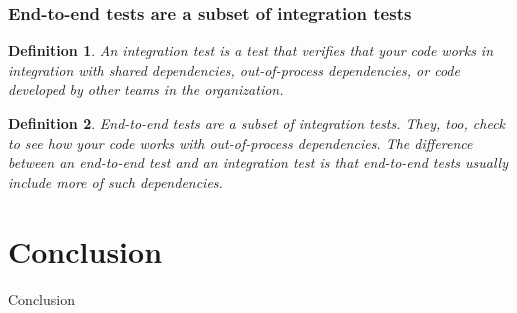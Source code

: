 \documentclass{article}
\newtheorem{definition}{Definition}
\begin{document}
\subsubsection{ End-to-end tests are a subset of integration tests}

\begin{definition}
An integration test is a test that verifies that your code works in integration with shared dependencies, out-of-process dependencies, or code developed by other teams in the organization.
\end{definition}

\begin{definition}
End-to-end tests are a subset of integration tests. They, too, check to see how your code works with out-of-process dependencies. The difference between an end-to-end test and an integration test is that end-to-end tests usually include more of such dependencies.
\end{definition}


\section{Conclusion}

Conclusion


\newpage

 

\end{document}
